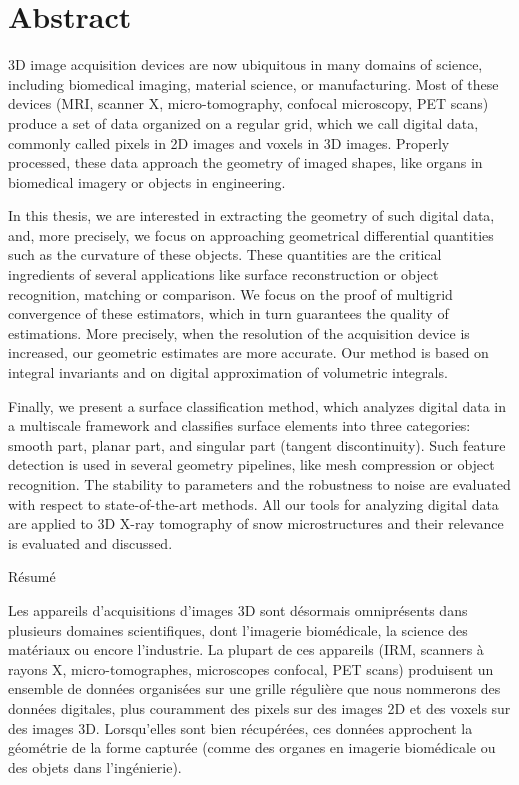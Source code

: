 %
\chapter*{Abstract}
\label{sec:abstract}
\vspace*{-10mm}

3D image acquisition devices are now ubiquitous in many domains of science,
including biomedical imaging, material science, or manufacturing. Most of these
devices (MRI, scanner X, micro-tomography, confocal microscopy, PET scans)
produce a set of data organized on a regular grid, which we call digital data,
commonly called pixels in 2D images and voxels in 3D images. Properly processed,
these data approach the geometry of imaged shapes, like organs in biomedical
imagery or objects in engineering.

In this thesis, we are interested in extracting the geometry of such digital
data, and, more precisely, we focus on approaching geometrical differential
quantities such as the curvature of these objects. These quantities are the
critical ingredients of several applications like surface reconstruction or
object recognition, matching or comparison. We focus on the proof of multigrid
convergence of these estimators, which in turn guarantees the quality of
estimations. More precisely, when the resolution of the acquisition device is
increased, our geometric estimates are more accurate. Our method is based on
integral invariants and on digital approximation of volumetric integrals.

Finally, we present a surface classification method, which analyzes digital data
in a multiscale framework and classifies surface elements into three categories:
smooth part, planar part, and singular part (tangent discontinuity). Such
feature detection is used in several geometry pipelines, like mesh compression
or object recognition. The stability to parameters and the robustness to noise
are evaluated with respect to state-of-the-art methods. All our tools for
analyzing digital data are applied to 3D X-ray tomography of snow
microstructures and their relevance is evaluated and discussed.

\vspace*{20mm}

{Résumé}
\label{sec:abstract-french}
\vspace*{5mm}

Les appareils d'acquisitions d'images 3D sont désormais omniprésents dans
plusieurs domaines scientifiques, dont l'imagerie biomédicale, la science des
matériaux ou encore l'industrie. La plupart de ces appareils (IRM, scanners à
rayons X, micro-tomographes, microscopes confocal, PET scans) produisent un
ensemble de données organisées sur une grille régulière que nous nommerons des
données digitales, plus couramment des pixels sur des images 2D et des voxels sur
des images 3D. Lorsqu'elles sont bien récupérées, ces données approchent la
géométrie de la forme capturée (comme des organes en imagerie biomédicale ou des
objets dans l'ingénierie).

